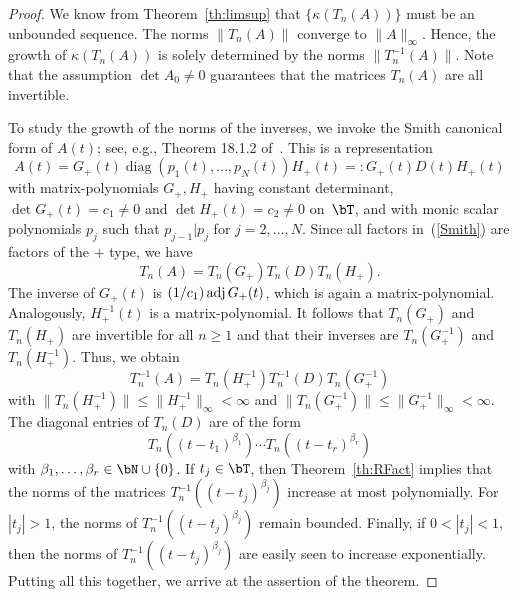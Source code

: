 \documentclass[addpoints,12pt,letter]{article}
\DeclareMathOperator{\diag}{diag}
\newcommand{\be}{\beta}
\newcommand{\ka}{\kappa}
\newcommand{\nf}{\infty}
\renewcommand{\ge}{\geqslant}
\renewcommand{\le}{\leqslant}
\numberwithin{equation}{section}
\theoremstyle{definition}
\begin{document}
\begin{proof}
We know from Theorem~\ref{th:limsup} that $\{\ka(T_{n}(A))\}$ must be an unbounded sequence.
The norms $\|T_{n}(A)\|$ converge to $\|A\|_{\nf}$.
Hence, the growth of $\ka(T_{n}(A))$ is solely determined by the norms $\|T_{n}^{-1}(A)\|$.
Note that the assumption $\det A_{0} \ne 0$ guarantees that the matrices $T_{n}(A)$ are all invertible.

To study the growth of the norms of the inverses, we invoke the Smith canonical form of $A(t)$; see, e.g., Theorem 18.1.2 of~\cite{Pra96}.
This is a representation
\begin{equation}\label{Smith}
A(t)=G_{+}(t)\diag(p_{1}(t), \ldots, p_N(t))H_{+}(t)=:G_{+}(t)D(t)H_{+}(t)
\end{equation}
with matrix-polynomials $G_{+},H_{+}$ having constant determinant, $\det G_{+}(t)=c_{1}\ne 0$ and $\det H_{+}(t)=c_{2}\ne 0$ on~$\bT$, and with monic scalar polynomials $p_{j}$ such that $p_{j-1}|p_{j}$ for $j=2, \ldots, N$.
Since all factors in~(\ref{Smith}) are factors of the $+$ type, we have
\[
T_{n}(A)=T_{n}(G_{+})T_{n}(D)T_{n}(H_{+}).
\]
The inverse of $G_{+}(t)$ is $(1/c_{1})\,{\rm adj}\, G_{+}(t)$, which is again a matrix-polynomial.
Analogously, $H_{+}^{-1}(t)$ is a matrix-polynomial.
It follows that $T_{n}(G_{+})$ and $T_{n}(H_{+})$ are invertible for all $n\ge 1$ and that their inverses are $T_{n}(G_{+}^{-1})$ and $T_{n}(H_{+}^{-1})$.
Thus, we obtain
\[
T_{n}^{-1}(A)=T_{n}(H_{+}^{-1}) T_{n}^{-1}(D) T_{n}(G_{+}^{-1})
\]
with $\|T_{n}(H_{+}^{-1})\|\le\|H_{+}^{-1}\|_{\nf}<\nf$ and $\|T_{n}(G_{+}^{-1})\|\le\|G_{+}^{-1}\|_{\nf}<\nf$.
The diagonal entries of $T_{n}(D)$ are of the form
\[
T_{n}((t-t_{1})^{\be_{1}})\cdots T_{n}((t-t_{r})^{\be_{r}})
\]
with $\be_{1}, \ldots, \be_{r}\in\bN \cup\{0\}$.
If $t_{j}\in\bT$, then Theorem~\ref{th:RFact} implies that the norms of the matrices $T_{n}^{-1}((t-t_{j})^{\be_{j}})$ increase at most polynomially.
For $|t_{j}|>1$, the norms of $T_{n}^{-1}((t-t_{j})^{\be_{j}})$ remain bounded.
Finally, if $0<|t_{j}|<1$, then the norms of $T_{n}^{-1}((t-t_{j})^{\be_{j}})$ are easily seen to increase exponentially.
Putting all this together, we arrive at the assertion of the theorem.
\end{proof}
\end{document}
